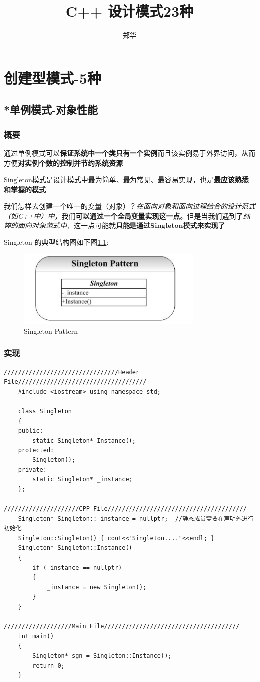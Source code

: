 \documentclass[UTF8,a4paper,12pt]{ctexbook}
\author{\kaishu 郑华}
\title{\textbf{C++ 设计模式23种}}
\begin{document}
	\maketitle
	\tableofcontents
	
\chapter{创建型模式-5种}
\section{*单例模式-对象性能}
	\subsection{概要}
		通过单例模式可以\textbf{保证系统中一个类只有一个实例}而且该实例易于外界访问，从而方便\textbf{对实例个数的控制并节约系统资源}
		
		Singleton模式是设计模式中最为简单、最为常见、最容易实现，也是\textbf{最应该熟悉和掌握的模式}
		
		我们怎样去创建一个唯一的变量（对象）？\textit{在面向对象和面向过程结合的设计范式（如C++中）中}，我们\textbf{可以通过一个全局变量实现这一点}。但是当我们遇到了\textit{纯粹的面向对象范式中}，这一点可能就\textbf{只能是通过Singleton模式来实现了}
		
		Singleton 的典型结构图如下图\ref{singleton}:
		\begin{figure}[h]
			\centering
			\includegraphics[width = 9cm]{Singleton.png}
			\caption{Singleton Pattern}
			\label{singleton}
		\end{figure}	
	\subsection{实现}
\begin{lstlisting}
////////////////////////////////Header File////////////////////////////////////
	#include <iostream> using namespace std;
			
	class Singleton
	{ 
	public: 
		static Singleton* Instance();
	protected:
		Singleton();
	private: 
		static Singleton* _instance;
	};
			
/////////////////////CPP File///////////////////////////////////////
	Singleton* Singleton::_instance = nullptr;  //静态成员需要在声明外进行初始化
	Singleton::Singleton() { cout<<"Singleton...."<<endl; }
	Singleton* Singleton::Instance() 
	{ 
		if (_instance == nullptr) 
		{ 
			_instance = new Singleton(); 
		}
	}
			
///////////////////Main File//////////////////////////////////////
	int main()
	{
		Singleton* sgn = Singleton::Instance();
		return 0;
	}
\end{lstlisting}
	
\end{document}

